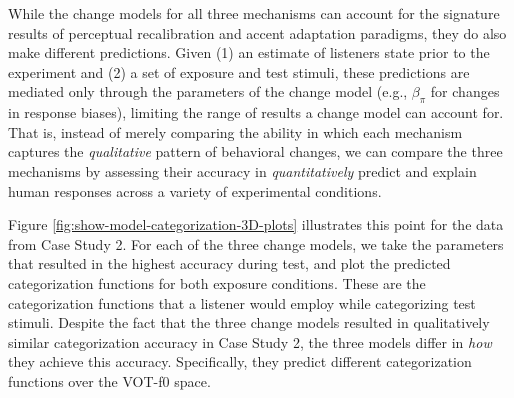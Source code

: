 \documentclass[
  11pt,
  english,
  man,floatsintext]{apa6}
\begin{document}
While the change models for all three mechanisms can account for the signature results of perceptual recalibration and accent adaptation paradigms, they do also make different predictions.
Given (1) an estimate of listeners state prior to the experiment and (2) a set of exposure and test stimuli, these predictions are mediated only through the parameters of the change model (e.g., \(\beta_{\pi}\) for changes in response biases), limiting the range of results a change model can account for. That is, instead of merely comparing the ability in which each mechanism captures the \emph{qualitative} pattern of behavioral changes, we can compare the three mechanisms by assessing their accuracy in \emph{quantitatively} predict and explain human responses across a variety of experimental conditions.

Figure \ref{fig:show-model-categorization-3D-plots} illustrates this point for the data from Case Study 2. For each of the three change models, we take the parameters that resulted in the highest accuracy during test, and plot the predicted categorization functions for both exposure conditions. These are the categorization functions that a listener would employ while categorizing test stimuli. Despite the fact that the three change models resulted in qualitatively similar categorization accuracy in Case Study 2, the three models differ in \emph{how} they achieve this accuracy. Specifically, they predict different categorization functions over the VOT-f0 space.
\end{document}
